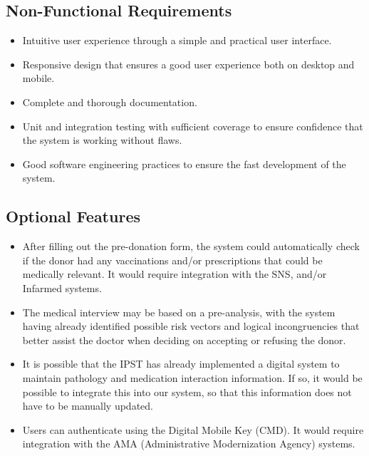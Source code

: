 \subsection{Non-Functional Requirements}
\begin{itemize}
	\item Intuitive user experience through a simple and practical user interface.
	
	\item Responsive design that ensures a good user experience both on desktop and mobile.
	
	\item Complete and thorough documentation.
	
	\item Unit and integration testing with sufficient coverage to ensure confidence that the system is working without flaws.
	
	\item Good software engineering practices to ensure the fast development of the system.
\end{itemize}

\subsection{Optional Features}
\begin{itemize}
	\item After filling out the pre-donation form, the system could automatically check if the donor had any vaccinations and/or prescriptions that could be medically relevant. It would require integration with the SNS, and/or Infarmed systems.
	\item The medical interview may be based on a pre-analysis, with the system having already identified possible risk vectors and logical incongruencies that better assist the doctor when deciding on accepting or refusing the donor.
	\item It is possible that the IPST has already implemented a digital system to maintain pathology and medication interaction information. If so, it would be possible to integrate this into our system, so that this information does not have to be manually updated.
	\item Users can authenticate using the Digital Mobile Key (CMD). It would require integration with the AMA (Administrative Modernization Agency) systems.
\end{itemize}

\pagebreak

